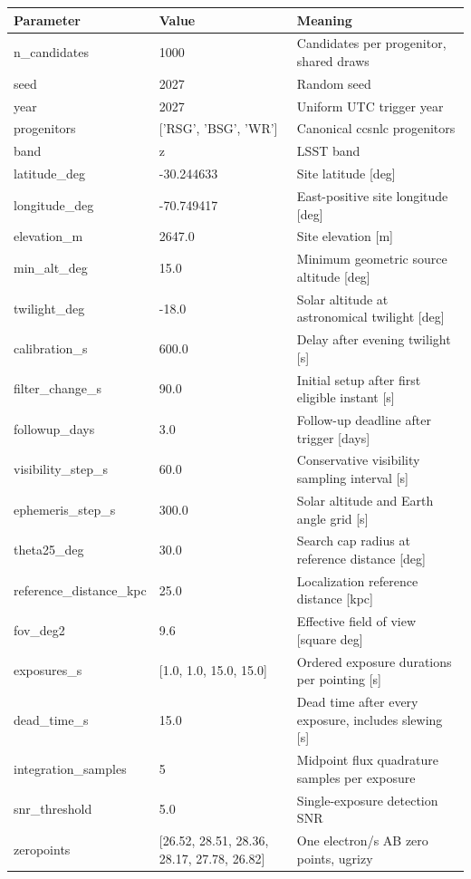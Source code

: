 \begin{longtable}{p{.29\linewidth}p{.25\linewidth}p{.37\linewidth}}
\toprule Parameter & Value & Meaning \\ \midrule\endhead
n\_candidates & 1000 & Candidates per progenitor, shared draws \\
seed & 2027 & Random seed \\
year & 2027 & Uniform UTC trigger year \\
progenitors & ['RSG', 'BSG', 'WR'] & Canonical ccsnlc progenitors \\
band & z & LSST band \\
latitude\_deg & -30.244633 & Site latitude [deg] \\
longitude\_deg & -70.749417 & East-positive site longitude [deg] \\
elevation\_m & 2647.0 & Site elevation [m] \\
min\_alt\_deg & 15.0 & Minimum geometric source altitude [deg] \\
twilight\_deg & -18.0 & Solar altitude at astronomical twilight [deg] \\
calibration\_s & 600.0 & Delay after evening twilight [s] \\
filter\_change\_s & 90.0 & Initial setup after first eligible instant [s] \\
followup\_days & 3.0 & Follow-up deadline after trigger [days] \\
visibility\_step\_s & 60.0 & Conservative visibility sampling interval [s] \\
ephemeris\_step\_s & 300.0 & Solar altitude and Earth angle grid [s] \\
theta25\_deg & 30.0 & Search cap radius at reference distance [deg] \\
reference\_distance\_kpc & 25.0 & Localization reference distance [kpc] \\
fov\_deg2 & 9.6 & Effective field of view [square deg] \\
exposures\_s & [1.0, 1.0, 15.0, 15.0] & Ordered exposure durations per pointing [s] \\
dead\_time\_s & 15.0 & Dead time after every exposure, includes slewing [s] \\
integration\_samples & 5 & Midpoint flux quadrature samples per exposure \\
snr\_threshold & 5.0 & Single-exposure detection SNR \\
zeropoints & [26.52, 28.51, 28.36, 28.17, 27.78, 26.82] & One electron/s AB zero points, ugrizy \\

\end{longtable}
